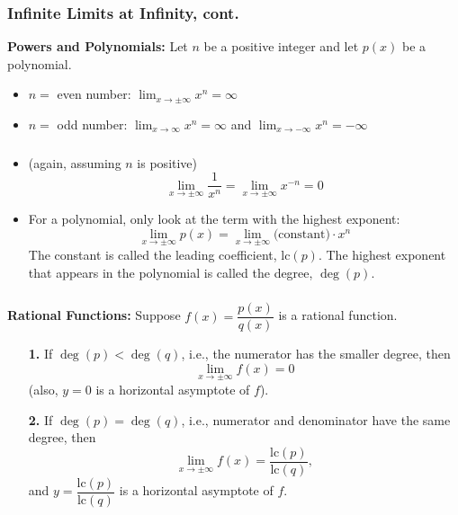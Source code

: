 \documentclass[14pt]{beamer}
\begin{document}
\begin{frame}
\frametitle{\small Infinite Limits at Infinity, cont.}
\small
{\bf Powers and Polynomials:}  Let $n$ be a positive integer and let $p(x)$ be a polynomial.

\vspace{1pc}
\begin{itemize}
\item $n=$ even number: $\displaystyle\lim_{x\to\pm\infty}x^n=\infty$ 

\vspace{1pc}
\item $n=$ odd number: $\displaystyle\lim_{x \to \infty} x^n = \infty$ and $\displaystyle\lim_{x \to -\infty} x^n = -\infty$
\end{itemize}
\end{frame}

\begin{frame}
\frametitle{}
\footnotesize
\begin{itemize}
\item (again, assuming $n$ is positive)
\[\lim_{x\to\pm\infty}\frac{1}{x^n}=\lim_{x\to\pm\infty}x^{-n}=0\]

\vspace{1pc}
\item For a polynomial, only look at the term with the highest exponent:
\[\lim_{x\to\pm\infty}p(x)=\lim_{x\to\pm\infty}\text{(constant)}\cdot x^n\] 
The constant is called the \alert{leading coefficient}, lc$(p)$.  The highest exponent that appears in the polynomial is called the \alert{degree}, $\deg(p)$.
\end{itemize}
\end{frame}

\begin{frame}
\frametitle{}
\footnotesize
{\bf Rational Functions:}  Suppose $f(x)=\dfrac{p(x)}{q(x)}$ is a rational function.

\begin{itemize}
\item[{\bf 1.}] If $\deg(p)<\deg(q)$, i.e., \alert{the numerator has the smaller degree}, then 
\[\lim_{x\to\pm\infty}f(x)=0\] 
(also, $y=0$ is a horizontal asymptote of $f$).

\vspace{2pc}
\item[{\bf 2.}] If $\deg(p)=\deg(q)$, i.e., \alert{numerator and denominator have the same degree}, then 
\[\lim_{x\to\pm\infty}f(x)=\dfrac{\text{lc}(p)}{\text{lc}(q)},\] 
and $y=\dfrac{\text{lc}(p)}{\text{lc}(q)}$ is a horizontal asymptote of $f$.
\end{itemize}
\end{frame}
\end{document}
